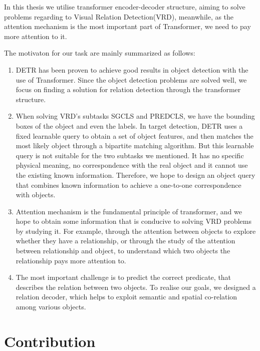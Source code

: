 In this thesis we utilise transformer encoder-decoder structure, aiming to solve problems regarding to Visual Relation Detection(VRD), meanwhile, as the attention mechanism is the most important part of Transformer, we need to pay more attention to it.

The motivaton for our task are mainly summarized as follows:

\begin{enumerate}[\qquad 1.]
	\item DETR has been proven to achieve good results in object detection with the use of Transformer. Since the object detection problems are solved well, we focus on finding a solution for relation detection through the transformer structure.
	\item When solving VRD's subtasks SGCLS and PREDCLS, we have the bounding boxes of the object and even the labels. In target detection, DETR uses a fixed learnable query to obtain a set of object features, and then matches the most likely object through a bipartite matching algorithm. But this learnable query is not suitable for the two subtasks we mentioned. It has no specific physical meaning, no correspondence with the real object and it cannot use the existing known information. Therefore, we hope to design an object query that combines known information to achieve a one-to-one correspondence with objects.
	\item Attention mechanism is the fundamental principle of transformer, and we hope to obtain some information that is conducive to solving VRD problems by studying it. For example, through the attention between objects to explore whether they have a relationship, or through the study of the attention between relationship and object, to understand which two objects the relationship pays more attention to.
	\item The most important challenge is to predict the correct predicate, that describes the relation between two objects. To realise our goals, we designed a relation decoder, which helps to exploit semantic and spatial co-relation among various objects.
\end{enumerate}
 
 
\section{Contribution}

